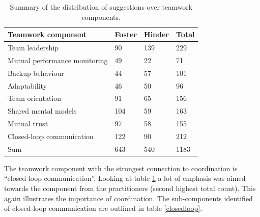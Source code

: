 \begin{table}[H]
\begin{center}
    \begin{tabular}{ | p{6cm} | p{2.5cm} | p{2.5cm} | p{2.5cm} |}
    \hline
    \textbf{Teamwork component} & \textbf{Foster} & \textbf{Hinder} & \textbf{Total} \\ \hline
    Team leadership & 90 & 139 & 229 \\ \hline
    Mutual performance monitoring & 49 & 22 & 71 \\ \hline
    Backup behaviour & 44 & 57 & 101 \\ \hline
    Adaptability & 46 & 50 & 96 \\ \hline
    Team orientation & 91 & 65 & 156 \\ \hline
    Shared mental models & 104 & 59 & 163 \\ \hline
    Mutual trust & 97 & 58 & 155 \\ \hline
    Closed-loop communication & 122 & 90 & 212 \\ \hline
    Sum & 643 & 540 & 1183 \\ \hline
    \end{tabular}
    \caption{Summary of the distribution of suggestions over teamwork components.}
    \label{summary2}
\end{center}
\end{table}

The teamwork component with the strongest connection to coordination is ``closed-loop communication''. Looking at table \ref{summary2} a lot of emphasis was aimed towards the component from the practitioners (second highest total count). This again illustrates the importance of coordination. The sub-components identified of closed-loop communication are outlined in table \ref{closedloop}.

